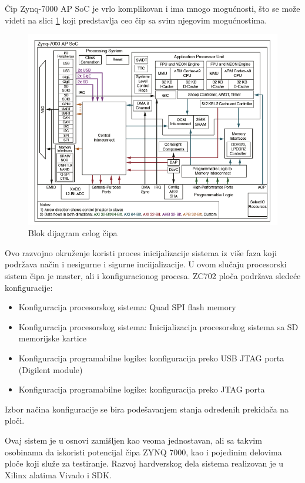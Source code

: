 \documentclass[a4paper, 12pt, diplomski]{etf}
\begin{document}
	Čip Zynq-7000 AP SoC je vrlo komplikovan i ima mnogo mogućnosti, što se može videti na slici \ref{fig:zynqBlock} koji predstavlja ceo čip sa svim njegovim mogućnostima.

		\begin{figure}[htb]
			\centering
			\includegraphics[width=.6\textwidth]{images/ZYNQ7000BD.png}
			\caption{Blok dijagram celog čipa}
			\label{fig:zynqBlock}
		\end{figure}

	Ovo razvojno okruženje koristi proces inicijalizacije sistema iz više faza koji podržava način i nesigurne i sigurne inciijalizacije. U ovom slučaju procesorski sistem čipa je master, ali i konfiguracionog procesa. ZC702 ploča podržava sledeće konfiguracije:

	\begin{itemize}

		\item Konfiguracija procesorskog sistema: Quad SPI flash memory
		\item Konfiguracija procesorskog sistema: Inicijalizacija procesorskog sistema sa SD memorijske kartice
		\item Konfiguracija programabilne logike: konfiguracija preko USB JTAG porta (Digilent module)
		\item Konfiguracija programabilne logike: konfiguracija preko JTAG porta

	\end{itemize}

	Izbor načina konfiguracije se bira podešavanjem stanja određenih prekidača na ploči.

	Ovaj sistem je u osnovi zamišljen kao veoma jednostavan, ali sa takvim osobinama da iskoristi potencijal čipa ZYNQ 7000, kao i pojedinim delovima ploče koji služe za testiranje. Razvoj hardverskog dela sistema realizovan je u Xilinx alatima Vivado i SDK.

	\newpage
\end{document}
